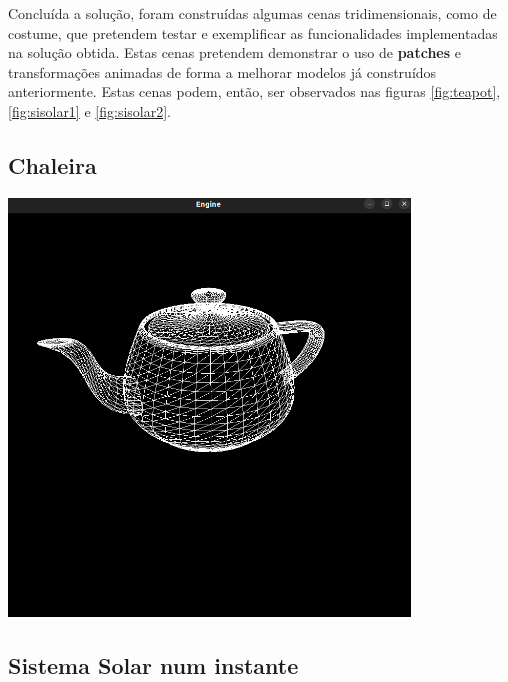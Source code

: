 Concluída a solução, foram construídas algumas cenas
tridimensionais, como de costume, que pretendem testar e exemplificar as funcionalidades
implementadas na solução obtida.
\newline
\break
\noindent
Estas cenas pretendem demonstrar o uso de \textbf{patches}
e transformações animadas de forma a melhorar modelos já construídos anteriormente.
\newline
\break
\noindent
Estas cenas podem, então, ser observados nas figuras
\ref{fig:teapot}, \ref{fig:sisolar1} e \ref{fig:sisolar2}.

\subsection{Chaleira}

\begin{center}
    \includegraphics[width=0.8\textwidth]{imgs/teapot.png}
    \label{fig:teapot}
\end{center}

\subsection{Sistema Solar num instante}

